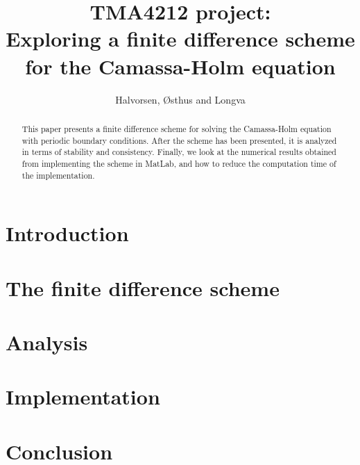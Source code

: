 \documentclass{article}
\title{TMA4212 project: \\ Exploring a finite difference scheme for the Camassa-Holm equation}
\author{Halvorsen, Østhus and Longva}
\begin{document}
\maketitle

\begin{abstract}
This paper presents a finite difference scheme for solving the Camassa-Holm equation with periodic boundary conditions. After the  scheme has been presented, it is analyzed in terms of stability and consistency. Finally, we look at the numerical results obtained from implementing the scheme in MatLab, and how to reduce the computation time of the implementation.
\end{abstract}


\section*{Introduction}


\newpage

\section*{The finite difference scheme}



%

\newpage

\section*{Analysis}



\section*{Implementation}


\section*{Conclusion}



{}

\end{document}
